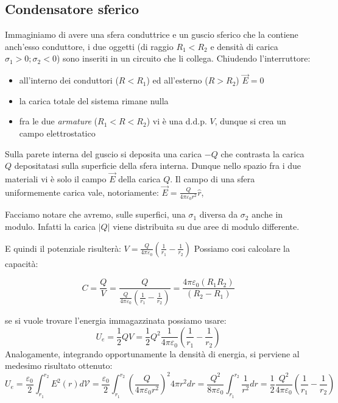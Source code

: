 \documentclass{book}
\begin{document}
\subsection{Condensatore sferico}
Immaginiamo di avere una sfera conduttrice e un guscio sferico che la contiene anch'esso conduttore, i due oggetti (di raggio $R_1<R_2$ e densità di carica $\sigma_1>0;\sigma_2<0$) sono inseriti in un circuito che li collega.
Chiudendo l'interruttore:
\begin{itemize}
  \item all'interno dei conduttori ($R<R_1$) ed all'esterno ($R>R_2$) $\vec{E}=0$ 
  \item la carica totale del sistema rimane nulla
  \item fra le due \textit{armature} ($R_1<R<R_2$) vi è una d.d.p. $V$, dunque si crea un campo elettrostatico 
\end{itemize}
Sulla parete interna del guscio si deposita una carica $-Q$ che contrasta la carica $Q$ depositatasi sulla superficie della sfera interna. 
Dunque nello spazio fra i due materiali vi è solo il campo $\vec{E}$ della carica $Q$. Il campo di una sfera uniformemente carica vale, notoriamente: $\vec{E}= \frac{Q}{4\pi \varepsilon_0 r^2}\hat{r}$, 


Facciamo notare che avremo, sulle superfici, una $\sigma_1$ diversa da $\sigma_2$ anche in modulo. Infatti la carica $\left|Q\right|$ viene distribuita su due aree di modulo differente.
\begin{center}
\end{center}

E quindi il potenziale risulterà: $V=\frac{Q}{4\pi \varepsilon_0 }(\frac{1}{r_1}-\frac{1}{r_2})$
Possiamo cosi calcolare la capacità:

$$
C=\frac{Q}{V}= \frac{Q}{\frac{Q}{4\pi \varepsilon_0 }(\frac{1}{r_1}-\frac{1}{r_2})} = \frac{4\pi\varepsilon_0 (R_1R_2)}{(R_2-R_1)}
$$

se si vuole trovare l'energia immagazzinata possiamo usare:
$$
U_e = \frac{1}{2}QV= \frac{1}{2}Q^2\frac{1}{4\pi \varepsilon_0 }(\frac{1}{r_1}-\frac{1}{r_2})
$$
Analogamente, integrando opportunamente la densità di energia, si perviene al medesimo risultato ottenuto:
$$
U_e = \frac{\varepsilon_0}{2}\int_{r_1}^{r_2}E^2(r)d\mathcal{V}=\frac{\varepsilon_0}{2}\int_{r_1}^{r_2} (\frac{Q}{4\pi\varepsilon_0r^2})^2 4\pi r^2dr = \frac{Q^2}{8\pi\varepsilon_0}\int_{r_1}^{r_2} \frac{1}{r^2}dr= \frac{1}{2}\frac{Q^2}{4\pi\varepsilon_0}(\frac{1}{r_1}-\frac{1}{r_2})
$$
\end{document}

